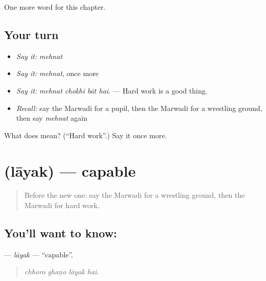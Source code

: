 \begin{grammarlens}[title={What you've built}]
One more word for this chapter.
\end{grammarlens}

\subsection*{Your turn}
\begin{itemize}
\raggedright
  \item \emph{Say it:} \emph{mehnat}
  \item \emph{Say it:} \emph{mehnat}, once more
  \item \emph{Say it:} \emph{mehnat chokhī bāt hai.} — Hard work is a good thing.
  \item \emph{Recall:} say the Marwadi for a pupil, then the Marwadi for a wrestling ground, then say \emph{mehnat} again
\end{itemize}

\begin{tcolorbox}[breakable,colback=teal!4,colframe=teal!35!black,title={Before you move on}]
What does  mean? (\textquotedblleft{}Hard work\textquotedblright{}.) Say it once more.
\end{tcolorbox}
\section[\texorpdfstring{\mw{लायक} (lāyak)}{लायक (lāyak)}]{ (lāyak) — capable}

\label{lesson:MW-C288-layak}



\begin{quote}
Before the new one: say the Marwadi for a wrestling ground, then the Marwadi for hard work.
\end{quote}

\subsection*{You'll want to know: }
\textbf{} — \emph{lāyak} — \textquotedblleft{}capable\textquotedblright{}.

\begin{quote}
   
\end{quote}

\begin{quote}
\emph{chhoro ghaṇo lāyak hai.}
\end{quote}

